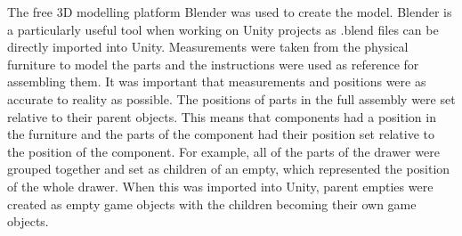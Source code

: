 \documentclass{l4proj}
\begin{document}
The free 3D modelling platform Blender was used to create the model. Blender is a particularly useful tool when working on Unity projects as .blend files can be directly imported into Unity. Measurements were taken from the physical furniture to model the parts and the instructions were used as reference for assembling them. It was important that measurements and positions were as accurate to reality as possible. The positions of parts in the full assembly were set relative to their parent objects. This means that components had a position in the furniture and the parts of the component had their position set relative to the position of the component. For example, all of the parts of the drawer were grouped together and set as children of an empty, which represented the position of the whole drawer. When this was imported into Unity, parent empties were created as empty game objects with the children becoming their own game objects.
\end{document}
